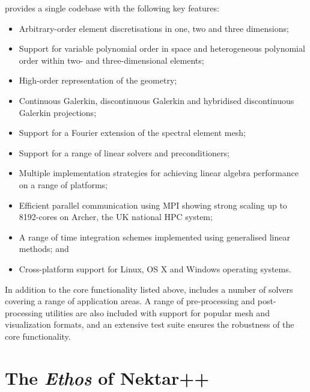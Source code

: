 \nek{} provides a single codebase with the following key features:
\begin{itemize}
  \item Arbitrary-order \shp{} element discretisations in one, two and three
  dimensions;
  \item Support for variable polynomial order in space and heterogeneous
  polynomial order within two- and three-dimensional elements;
  \item High-order representation of the geometry;
  \item Continuous Galerkin, discontinuous Galerkin and hybridised discontinuous
  Galerkin projections;
  \item Support for a Fourier extension of the spectral element mesh;
  \item Support for a range of linear solvers and preconditioners;
  \item Multiple implementation strategies for achieving linear algebra
  performance on a range of platforms;
  \item Efficient parallel communication using MPI showing strong scaling up to
  8192-cores on Archer, the UK national HPC system;
  \item A range of time integration schemes implemented using generalised linear
  methods; and
  \item Cross-platform support for Linux, OS X and Windows operating
  systems.
\end{itemize}

In addition to the core functionality listed above, \nek{} includes a
number of solvers covering a range of application areas. A range
of pre-processing and post-processing utilities are also included with support
for popular mesh and visualization formats, and an extensive test suite ensures
the robustness of the core functionality.



\section{The {\em Ethos} of Nektar++}


